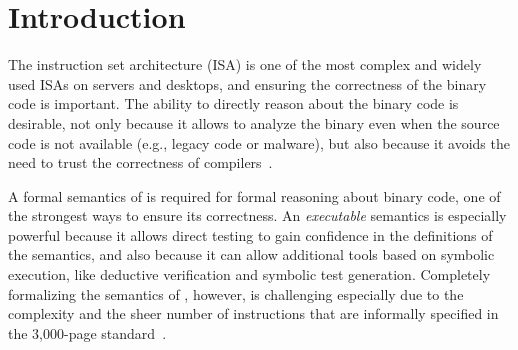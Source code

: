 \section{Introduction}
\label{sec:Intro}


The \ISA instruction set architecture (ISA) is one of the most complex and widely used ISAs on servers and desktops, 
and ensuring the correctness of the \ISA binary code is important.
%
The ability to directly reason about the binary code is desirable, not only because it allows to analyze the binary even when the source code is not available (e.g., legacy code or malware), but also because it avoids the need to trust the correctness of compilers~\cite{Thompson,WYSINWYE}.



A formal semantics of \ISA is required for formal reasoning about binary code, one of the strongest ways to ensure its correctness.
%
An \emph{executable} semantics is especially powerful because it allows direct testing to gain confidence in the definitions of the semantics, and also because it can allow additional tools based on symbolic execution, like deductive verification and symbolic test generation.
%
Completely formalizing the semantics of \ISA, however, is challenging especially due to the complexity and the sheer number of instructions that are informally specified in the 3,000-page standard~\cite{IntelManual}.

